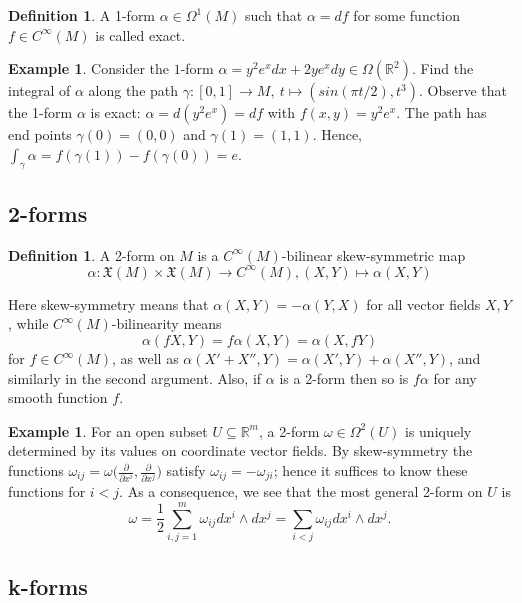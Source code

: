 \documentclass{article}
\theoremstyle{definition}
\newtheorem{defn}[theorem]{Definition}
\newtheorem{example}[theorem]{Example}
\newenvironment{definition}
  {\vspace{8pt}\begin{mdframed}[backgroundcolor=blueish,innertopmargin=4]\begin{defn}}
  {\end{defn}\end{mdframed}\vspace{4pt}}
\begin{document}
\begin{definition}

A 1-form $\alpha \in \Omega^1(M)$ such that $\alpha = d f$ for some function $f \in C^\infty(M)$ is called exact.
\end{definition}

\begin{example}
Consider the $1$-form $\alpha = y^2 e^x dx+2y e^x dy \in \Omega(\mathbb R^2)$. Find the integral of $\alpha$ along the path $\gamma  : [0,1] \rightarrow M, \ t \mapsto (sin(\pi t/2),t^3 )$. Observe that the 1-form $\alpha$ is exact: $\alpha = d (y^2 e^x) = d f$ with $f(x, y) = y^2 e^x $. The path has end points $\gamma (0) = (0,0)$ and $\gamma (1) = (1,1)$. Hence, $\int_\gamma  \alpha = f(\gamma (1))- f(\gamma (0)) = e$.
\end{example}

\subsection{2-forms}
\begin{definition}
A 2-form on $M$ is a $C^\infty(M)$-bilinear skew-symmetric map 
\[
    \alpha : \mathfrak X(M)\times \mathfrak X(M) \rightarrow C^\infty (M), (X,Y) \mapsto \alpha (X,Y)
\]

Here skew-symmetry means that $\alpha(X,Y) = -\alpha(Y,X)$ for all vector fields $X,Y$, while $C^\infty(M)$-bilinearity means 
\[
\alpha(f X,Y) = f\alpha(X,Y) = \alpha(X, fY)
\] 
for $f \in C^\infty(M)$, as well as $\alpha(X' + X'' ,Y) = \alpha(X',Y) + \alpha(X'',Y)$, and similarly in the second argument. Also, if $\alpha$ is a 2-form then so is $f\alpha$ for any smooth function $f$.
\end{definition}

\begin{example}
For an open subset $U \subseteq \mathbb R^m$, a 2-form $\omega \in \Omega^2 (U)$ is uniquely determined by its values on coordinate vector fields. By skew-symmetry the functions $\omega_{i j} = \omega  \bigg ( \frac{\partial}{\partial  x^i} , \frac{\partial}{ \partial  x^j} \bigg )$ satisfy $\omega_{i j} = -\omega_{ji}$; hence it suffices to know these functions for $i < j$. As a consequence, we see that the most general 2-form on $U$ is 
\[
    \omega  = \frac{1}{2} \sum^m_{i, j=1} \omega_{i j} dx^i \wedge dx ^j = \sum_{i<j} \omega_{i j}dx^i \wedge dx^j.
\]

\end{example}

\subsection{k-forms}
\end{document}
